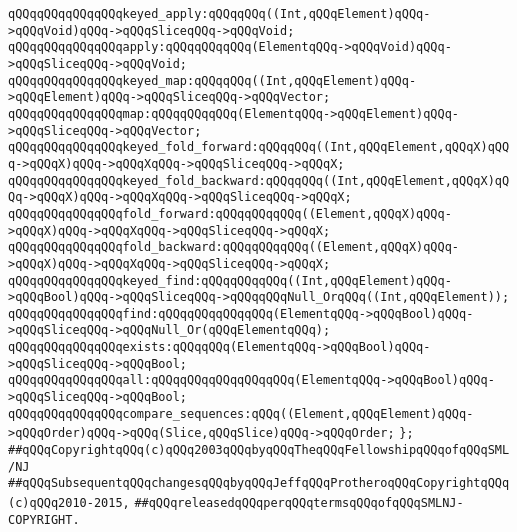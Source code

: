 \verb|qQQqqQQqqQQqqQQqkeyed_apply:qQQqqQQq((Int,qQQqElement)qQQq->qQQqVoid)qQQq->qQQqSliceqQQq->qQQqVoid;|\newline
\verb|qQQqqQQqqQQqqQQqapply:qQQqqQQqqQQq(ElementqQQq->qQQqVoid)qQQq->qQQqSliceqQQq->qQQqVoid;|\newline
\newline
\verb|qQQqqQQqqQQqqQQqkeyed_map:qQQqqQQq((Int,qQQqElement)qQQq->qQQqElement)qQQq->qQQqSliceqQQq->qQQqVector;|\newline
\verb|qQQqqQQqqQQqqQQqmap:qQQqqQQqqQQq(ElementqQQq->qQQqElement)qQQq->qQQqSliceqQQq->qQQqVector;|\newline
\newline
\verb|qQQqqQQqqQQqqQQqkeyed_fold_forward:qQQqqQQq((Int,qQQqElement,qQQqX)qQQq->qQQqX)qQQq->qQQqXqQQq->qQQqSliceqQQq->qQQqX;|\newline
\verb|qQQqqQQqqQQqqQQqkeyed_fold_backward:qQQqqQQq((Int,qQQqElement,qQQqX)qQQq->qQQqX)qQQq->qQQqXqQQq->qQQqSliceqQQq->qQQqX;|\newline
\newline
\verb|qQQqqQQqqQQqqQQqfold_forward:qQQqqQQqqQQq((Element,qQQqX)qQQq->qQQqX)qQQq->qQQqXqQQq->qQQqSliceqQQq->qQQqX;|\newline
\verb|qQQqqQQqqQQqqQQqfold_backward:qQQqqQQqqQQq((Element,qQQqX)qQQq->qQQqX)qQQq->qQQqXqQQq->qQQqSliceqQQq->qQQqX;|\newline
\newline
\verb|qQQqqQQqqQQqqQQqkeyed_find:qQQqqQQqqQQq((Int,qQQqElement)qQQq->qQQqBool)qQQq->qQQqSliceqQQq->qQQqqQQqNull_OrqQQq((Int,qQQqElement));|\newline
\verb|qQQqqQQqqQQqqQQqfind:qQQqqQQqqQQqqQQq(ElementqQQq->qQQqBool)qQQq->qQQqSliceqQQq->qQQqNull_Or(qQQqElementqQQq);|\newline
\newline
\verb|qQQqqQQqqQQqqQQqexists:qQQqqQQq(ElementqQQq->qQQqBool)qQQq->qQQqSliceqQQq->qQQqBool;|\newline
\verb|qQQqqQQqqQQqqQQqall:qQQqqQQqqQQqqQQqqQQq(ElementqQQq->qQQqBool)qQQq->qQQqSliceqQQq->qQQqBool;|\newline
\newline
\verb|qQQqqQQqqQQqqQQqcompare_sequences:qQQq((Element,qQQqElement)qQQq->qQQqOrder)qQQq->qQQq(Slice,qQQqSlice)qQQq->qQQqOrder;|\newline
\verb|};|\newline
\newline
\newline
\verb|##qQQqCopyrightqQQq(c)qQQq2003qQQqbyqQQqTheqQQqFellowshipqQQqofqQQqSML/NJ|\newline
\verb|##qQQqSubsequentqQQqchangesqQQqbyqQQqJeffqQQqProtheroqQQqCopyrightqQQq(c)qQQq2010-2015,|\newline
\verb|##qQQqreleasedqQQqperqQQqtermsqQQqofqQQqSMLNJ-COPYRIGHT.|\newline

